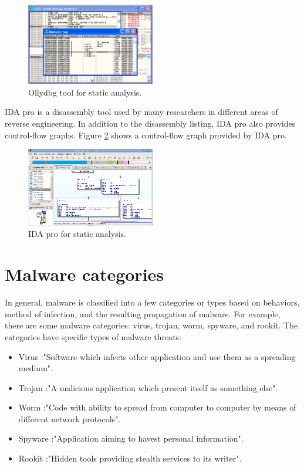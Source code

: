 \begin{figure}[h!]
\centering
\includegraphics[width=0.5\textwidth]{graph/OllyDbg.png}
\caption{Ollydbg tool for static analysis.}
\label{fig:OllyDbg}
\end{figure}

IDA pro is a disassembly tool used by many researchers in different areas of reverse engineering. In addition to the disassembly listing, IDA pro also provides control-flow graphs. Figure \ref{fig:IDApro} shows a control-flow graph provided by IDA pro.

\begin{figure}[h!]
\centering
\includegraphics[width=0.5\textwidth]{graph/idapro.png}
\caption{IDA pro for static analysis.}
\label{fig:IDApro}
\end{figure}


\section{Malware categories}

In general, malware is classified into a few categories or types based on behaviors, method of infection, and the resulting propagation of malware. For example, there are some malware categories: virus, trojan, worm, spyware, and rookit. The categories have specific types of malware threats:

\begin{itemize}
\item Virus :"Software which infects other application and use them as a spreading medium"\cite{BlackHat}.
\item Trojan :"A malicious application which present itself as something else"\cite{BlackHat}.
\item Worm :"Code with ability to spread from computer to computer by means of different network protocols"\cite{BlackHat}.
\item Spyware :"Application aiming to havest personal information"\cite{BlackHat}.
\item Rookit :"Hidden tools providing stealth services to its writer"\cite{BlackHat}.
\end{itemize}

